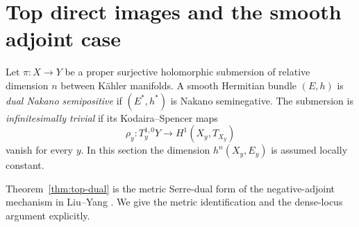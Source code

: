 \documentclass[11pt,reqno]{amsart}
\numberwithin{equation}{section}
\theoremstyle{definition}
\theoremstyle{remark}
\begin{document}
\section{Top direct images and the smooth adjoint case}\label{sec:smooth-duality}

Let $\pi:X\to Y$ be a proper surjective holomorphic submersion of
relative dimension $n$ between K\"ahler manifolds.  A smooth Hermitian
bundle $(E,h)$ is \emph{dual Nakano semipositive} if $(E^*,h^*)$ is
Nakano seminegative.  The submersion is \emph{infinitesimally trivial}
if its Kodaira--Spencer maps
\[
 \rho_y:T_y^{1,0}Y\longrightarrow H^1(X_y,T_{X_y})
\]
vanish for every $y$.  In this section the dimension
$h^n(X_y,E_y)$ is assumed locally constant.


Theorem~\ref{thm:top-dual} is the metric Serre-dual form of the negative-adjoint
mechanism in Liu--Yang \cite[Theorem 4.1]{LY14}.  We give the metric
identification and the dense-locus argument explicitly.
\end{document}
